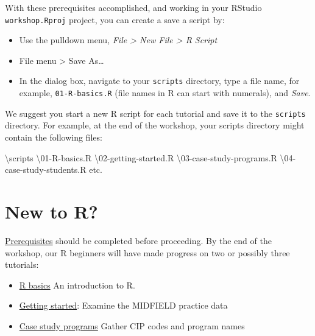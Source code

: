 \documentclass[
]{book}
\newenvironment{Shaded}{\begin{snugshade}}{\end{snugshade}}
\newcommand{\DecValTok}[1]{\textcolor[rgb]{0.00,0.00,0.81}{#1}}
\newcommand{\NormalTok}[1]{#1}
\newcommand{\SpecialCharTok}[1]{\textcolor[rgb]{0.00,0.00,0.00}{#1}}
\providecommand{\tightlist}{%
  \setlength{\itemsep}{0pt}\setlength{\parskip}{0pt}}
\begin{document}
With these prerequisites accomplished, and working in your RStudio \texttt{workshop.Rproj} project, you can create a save a script by:

\begin{itemize}
\tightlist
\item
  Use the pulldown menu, \emph{File \textgreater{} New File \textgreater{} R Script}
\item
  File menu \textgreater{} Save As\ldots{}
\item
  In the dialog box, navigate to your \texttt{scripts} directory, type a file name, for example, \texttt{01-R-basics.R} (file names in R can start with numerals), and \emph{Save}.
\end{itemize}

We suggest you start a new R script for each tutorial and save it to the \texttt{scripts} directory. For example, at the end of the workshop, your scripts directory might contain the following files:

\begin{Shaded}
\begin{Highlighting}[]
\NormalTok{        \textbackslash{}scripts    }
\NormalTok{            \textbackslash{}}\DecValTok{01}\SpecialCharTok{{-}}\NormalTok{R}\SpecialCharTok{{-}}\NormalTok{basics.R    }
\NormalTok{            \textbackslash{}}\DecValTok{02}\SpecialCharTok{{-}}\NormalTok{getting}\SpecialCharTok{{-}}\NormalTok{started.R    }
\NormalTok{            \textbackslash{}}\DecValTok{03}\SpecialCharTok{{-}}\NormalTok{case}\SpecialCharTok{{-}}\NormalTok{study}\SpecialCharTok{{-}}\NormalTok{programs.R    }
\NormalTok{            \textbackslash{}}\DecValTok{04}\SpecialCharTok{{-}}\NormalTok{case}\SpecialCharTok{{-}}\NormalTok{study}\SpecialCharTok{{-}}\NormalTok{students.R     }
\NormalTok{            etc.  }
\end{Highlighting}
\end{Shaded}

\hypertarget{new-to-r}{%
\section{New to R?}\label{new-to-r}}

\protect\hyperlink{prerequisites}{Prerequisites} should be completed before proceeding. By the end of the workshop, our R beginners will have made progress on two or possibly three tutorials:

\begin{itemize}
\tightlist
\item
  \protect\hyperlink{r-basics}{R basics} An introduction to R.
\item
  \href{https://midfieldr.github.io/midfieldr/articles/art-000-getting-started.html}{Getting started}: Examine the MIDFIELD practice data\\
\item
  \href{https://midfieldr.github.io/midfieldr/articles/art-110-case-study-programs.html}{Case study programs} Gather CIP codes and program names
\end{itemize}
\end{document}
